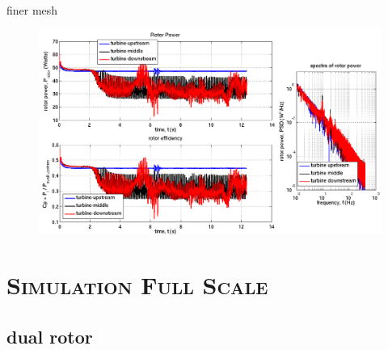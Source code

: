 \documentclass[xcolor=x11names,compress]{beamer}
\begin{document}
	\begin{frame}{finer mesh}
		
		\vspace{-20pt}

		\begin{figure}[p]
		    \centering
		    \includegraphics[width=1.08\textwidth]{figures/Analysis_Slide_finer-mesh.png}
		\end{figure}

	\end{frame}

\section{\scshape Simulation Full Scale}

\subsection{dual rotor}
\end{document}
